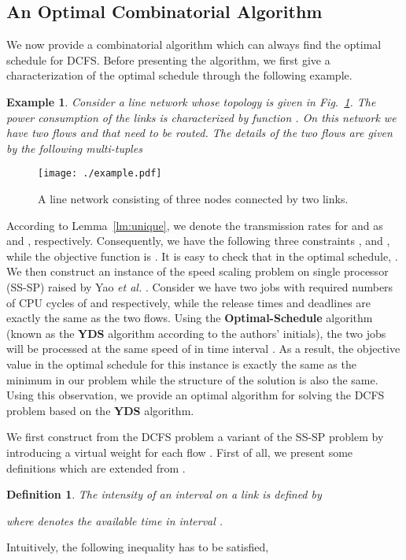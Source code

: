 \documentclass[10pt, conference, compsocconf]{IEEEtran}
\newtheorem{definition}{Definition}
\newtheorem{example}{Example}
\begin{document}
\subsection{An Optimal Combinatorial Algorithm}

We now provide a combinatorial algorithm which can always find the optimal schedule for DCFS. Before presenting the algorithm, we first give a characterization of the optimal schedule through the following example.
\begin{example}
Consider a line network whose topology is given in Fig.~\ref{fig:example_1}. The power consumption of the links is characterized by function . On this network we have two flows  and  that need to be routed. The details of the two flows are given by the following multi-tuples

\end{example}
\begin{figure}[t!]
\centering
\texttt{[image: ./example.pdf]}
\caption{\label{fig:example_1} A line network consisting of three nodes connected by two links. }
\end{figure}
According to Lemma~\ref{lm:unique}, we denote the transmission rates for  and  as  and , respectively. Consequently, we have the following three constraints ,  and , while the objective function is . It is easy to check that in the optimal schedule, . We then construct an instance of the speed scaling problem on single processor (SS-SP) raised by Yao \emph{et al.} \cite{Yao_Demers_Shenker-YDS-1995}. Consider we have two jobs with required numbers of CPU cycles of  and  respectively, while the release times and deadlines are exactly the same as the two flows. Using the \textbf{Optimal-Schedule} algorithm (known as the \textbf{YDS} algorithm according to the authors' initials), the two jobs will be processed at the same speed of  in time interval . As a result, the objective value in the optimal schedule for this instance is exactly the same as the minimum  in our problem while the structure of the solution is also the same. Using this observation, we provide an optimal algorithm for solving the DCFS problem based on the \textbf{YDS} algorithm. 

We first construct from the DCFS problem a variant of the SS-SP problem by introducing a virtual weight  for each flow . First of all, we present some definitions which are extended from \cite{Yao_Demers_Shenker-YDS-1995}.
\begin{definition}
The intensity of an interval  on a link  is defined by

where  denotes the available time in interval .
\end{definition}
Intuitively, the following inequality has to be satisfied,
\end{document}
